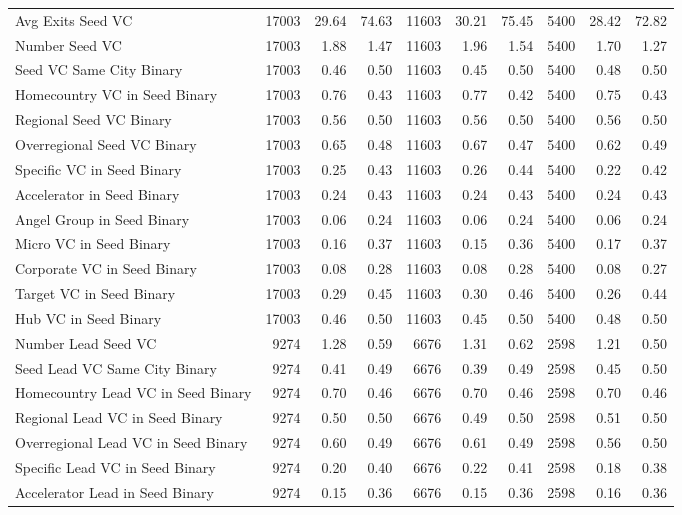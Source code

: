 {\begin{table}[!h]
{\begin{tabular}[t]{lrrrrrrrrr}
Avg Exits Seed VC & 17003 & 29.64 & 74.63 & 11603 & 30.21 & 75.45 & 5400 & 28.42 & 72.82\\
Number Seed VC & 17003 & 1.88 & 1.47 & 11603 & 1.96 & 1.54 & 5400 & 1.70 & 1.27\\
Seed VC Same City Binary & 17003 & 0.46 & 0.50 & 11603 & 0.45 & 0.50 & 5400 & 0.48 & 0.50\\
Homecountry VC in Seed Binary & 17003 & 0.76 & 0.43 & 11603 & 0.77 & 0.42 & 5400 & 0.75 & 0.43\\
\addlinespace
Regional Seed VC Binary & 17003 & 0.56 & 0.50 & 11603 & 0.56 & 0.50 & 5400 & 0.56 & 0.50\\
Overregional Seed VC Binary & 17003 & 0.65 & 0.48 & 11603 & 0.67 & 0.47 & 5400 & 0.62 & 0.49\\
Specific VC in Seed Binary & 17003 & 0.25 & 0.43 & 11603 & 0.26 & 0.44 & 5400 & 0.22 & 0.42\\
Accelerator in Seed Binary & 17003 & 0.24 & 0.43 & 11603 & 0.24 & 0.43 & 5400 & 0.24 & 0.43\\
Angel Group in Seed Binary & 17003 & 0.06 & 0.24 & 11603 & 0.06 & 0.24 & 5400 & 0.06 & 0.24\\
\addlinespace
Micro VC in Seed Binary & 17003 & 0.16 & 0.37 & 11603 & 0.15 & 0.36 & 5400 & 0.17 & 0.37\\
Corporate VC in Seed Binary & 17003 & 0.08 & 0.28 & 11603 & 0.08 & 0.28 & 5400 & 0.08 & 0.27\\
Target VC in Seed Binary & 17003 & 0.29 & 0.45 & 11603 & 0.30 & 0.46 & 5400 & 0.26 & 0.44\\
Hub VC in Seed Binary & 17003 & 0.46 & 0.50 & 11603 & 0.45 & 0.50 & 5400 & 0.48 & 0.50\\
Number Lead Seed VC & 9274 & 1.28 & 0.59 & 6676 & 1.31 & 0.62 & 2598 & 1.21 & 0.50\\
\addlinespace
Seed Lead VC Same City Binary & 9274 & 0.41 & 0.49 & 6676 & 0.39 & 0.49 & 2598 & 0.45 & 0.50\\
Homecountry Lead VC in Seed Binary & 9274 & 0.70 & 0.46 & 6676 & 0.70 & 0.46 & 2598 & 0.70 & 0.46\\
Regional Lead VC in Seed Binary & 9274 & 0.50 & 0.50 & 6676 & 0.49 & 0.50 & 2598 & 0.51 & 0.50\\
Overregional Lead VC in Seed Binary & 9274 & 0.60 & 0.49 & 6676 & 0.61 & 0.49 & 2598 & 0.56 & 0.50\\
Specific Lead VC in Seed Binary & 9274 & 0.20 & 0.40 & 6676 & 0.22 & 0.41 & 2598 & 0.18 & 0.38\\
\addlinespace
Accelerator Lead in Seed Binary & 9274 & 0.15 & 0.36 & 6676 & 0.15 & 0.36 & 2598 & 0.16 & 0.36\\

\end{tabular}}
\end{table}}
